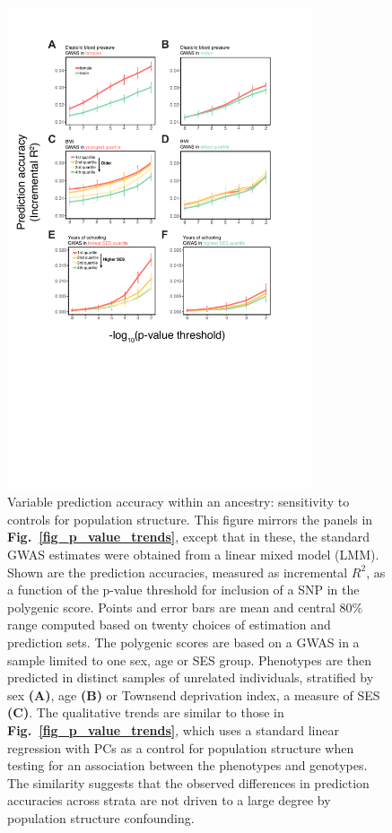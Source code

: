 \documentclass[hidelinks, 12pt]{article}
\begin{document}
\pagebreak

\begin{figure}[h]
\centering
\includegraphics[width=0.8\textwidth]{./supp_figures/bolt.pdf}
\caption[Variable prediction accuracy within an ancestry: sensitivity to controls for population structure]{\small Variable prediction accuracy within an ancestry: sensitivity to controls for population structure. This figure mirrors the panels in {\bf Fig.~\ref{fig_p_value_trends}}, except that in these, the standard GWAS estimates were obtained from a linear mixed model (LMM). Shown are the prediction accuracies, measured as incremental $R^2$, as a function of the p-value threshold for inclusion of a SNP in the polygenic score. Points and error bars are mean and central 80\% range computed based on twenty choices of estimation and prediction sets. The polygenic scores are based on a GWAS in a sample limited to one sex, age or SES group. Phenotypes are then predicted in distinct samples of unrelated individuals, stratified by sex {\bf (A)}, age {\bf (B)} or Townsend deprivation index, a measure of SES {\bf (C)}. The qualitative trends are similar to those in {\bf Fig.~\ref{fig_p_value_trends}}, which uses a standard linear regression with PCs as a control for population structure when testing for an association between the phenotypes and genotypes. The similarity suggests that the observed differences in prediction accuracies across strata are not driven to a large degree by population structure confounding.}
\centering
\end{figure}
\end{document}
